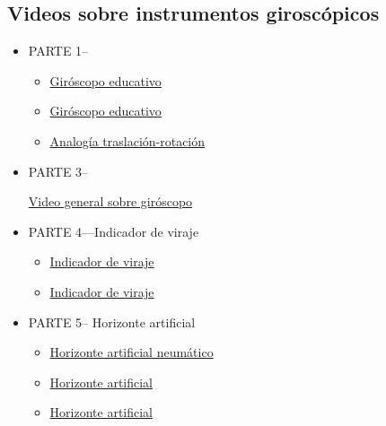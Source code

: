 \subsection{Videos sobre instrumentos girosc\'opicos}
\label{sec:05.videos.instrumentos.giroscopicos}

  \begin{itemize}

  \item PARTE 1--                                                                     

    \begin{itemize}
    \item \href{https://www.youtube.com/watch?v=fVefWA-SV2g&feature=relmfu}{Giróscopo
        educativo }

    \item \href{https://www.youtube.com/watch?v=VXePbCxCzRA}{Giróscopo
        educativo }

    \item \href{https://www.youtube.com/watch?v=-NSUIEOPjrY}{Analogía
        traslación-rotación}
    \end{itemize}

  \item PARTE 3--

\href{https://www.youtube.com/watch?v=hVsx4XWafXg}{Video  general sobre giróscopo }

\item PARTE 4—Indicador de viraje

  \begin{itemize}
  \item \href{https://www.youtube.com/watch?v=0sRrSkSJc7w}{Indicador
      de viraje }

  \item \href{https://www.youtube.com/watch?v=a4iLtZPp_-8}{Indicador
      de viraje }
  \end{itemize}


\item PARTE 5-- Horizonte artificial

  \begin{itemize}
  \item \href{https://www.youtube.com/watch?v=f2thngd9AGI}{Horizonte
      artificial neumático}

  \item
    \href{https://www.facebook.com/1Elaviador/videos/492439044662271/}{Horizonte
      artificial }

  \item
    \href{https://www.facebook.com/Pilotviewglobal/videos/354425058384879/}{Horizonte
      artificial }


\end{itemize}
\end{itemize}
